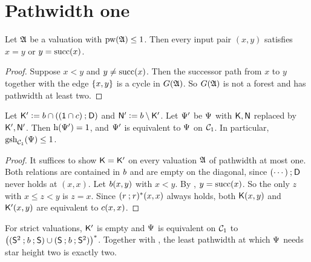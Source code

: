 \section{Pathwidth one}\label{section: pathwidth one}

\begin{lemma}\label{lemma: pathwidth one pairs}
  Let $\mathfrak{A}$ be a valuation with $\mathrm{pw}(\mathfrak{A}) \le 1$.
  Then every input pair $(x, y)$ satisfies $x = y$ or $y = \mathrm{succ}(x)$.
\end{lemma}
\begin{proof}
  Suppose $x < y$ and $y \ne \mathrm{succ}(x)$.
  Then the successor path from $x$ to $y$ together with the edge $\{x, y\}$ is a cycle in $G(\mathfrak{A})$.
  So $G(\mathfrak{A})$ is not a forest and has pathwidth at least two.
\end{proof}

\begin{proposition}\label{proposition: pathwidth one}
  Let $\mathsf{K}' \mathrel{\vcentcolon=} b \cap ((\mathsf{1} \cap c) \mathbin{;} \mathsf{D})$ and $\mathsf{N}' \mathrel{\vcentcolon=} b \setminus \mathsf{K}'$.
  Let $\Psi'$ be $\Psi$ with $\mathsf{K}, \mathsf{N}$ replaced by $\mathsf{K}', \mathsf{N}'$.
  Then $\mathrm{h}(\Psi') = 1$, and $\Psi'$ is equivalent to $\Psi$ on $\mathcal{C}_{1}$.
  In particular, $\mathrm{gsh}_{\mathcal{C}_{1}}(\Psi) \le 1$.
\end{proposition}
\begin{proof}
  It suffices to show $\mathsf{K} = \mathsf{K}'$ on every valuation $\mathfrak{A}$ of pathwidth at most one.
  Both relations are contained in $b$ and are empty on the diagonal, since $(\cdots) \mathbin{;} \mathsf{D}$ never holds at $(x, x)$.
  Let $b(x, y)$ with $x < y$.
  By , $y = \mathrm{succ}(x)$.
  So the only $z$ with $x \le z < y$ is $z = x$.
  Since $(r \mathbin{;} r)^{*}(x, x)$ always holds, both $\mathsf{K}(x, y)$ and $\mathsf{K}'(x, y)$ are equivalent to $c(x, x)$.
\end{proof}

For strict valuations, $\mathsf{K}'$ is empty and $\Psi$ is equivalent on $\mathcal{C}_{1}$ to $\bigl((\mathsf{S}^{2} \mathbin{;} b \mathbin{;} \mathsf{S}) \cup (\mathsf{S} \mathbin{;} b \mathbin{;} \mathsf{S}^{2})\bigr)^{*}$.
Together with , the least pathwidth at which $\Psi$ needs star height two is exactly two.

